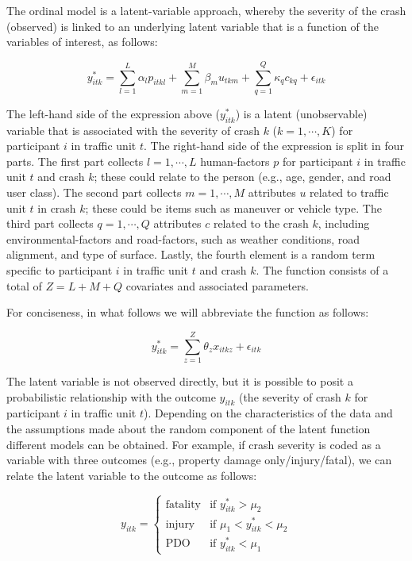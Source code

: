 \documentclass[]{elsarticle} %
\begin{document}
The ordinal model is a latent-variable approach, whereby the severity of
the crash (observed) is linked to an underlying latent variable that is
a function of the variables of interest, as follows:

\begin{equation}
\label{eq:latent-function}
y_{itk}^*=\sum_{l=1}^L\alpha_lp_{itkl} + \sum_{m=1}^M\beta_mu_{tkm} + \sum_{q=1}^Q\kappa_qc_{kq} + \epsilon_{itk}
\end{equation}

The left-hand side of the expression above (\(y_{itk}^*\)) is a latent
(unobservable) variable that is associated with the severity of crash
\(k\) (\(k=1,\cdots,K\)) for participant \(i\) in traffic unit \(t\).
The right-hand side of the expression is split in four parts. The first
part collects \(l=1,\cdots,L\) human-factors \(p\) for participant \(i\)
in traffic unit \(t\) and crash \(k\); these could relate to the person
(e.g., age, gender, and road user class). The second part collects
\(m=1,\cdots,M\) attributes \(u\) related to traffic unit \(t\) in crash
\(k\); these could be items such as maneuver or vehicle type. The third
part collects \(q=1,\cdots,Q\) attributes \(c\) related to the crash
\(k\), including environmental-factors and road-factors, such as weather
conditions, road alignment, and type of surface. Lastly, the fourth
element is a random term specific to participant \(i\) in traffic unit
\(t\) and crash \(k\). The function consists of a total of \(Z=L+M+Q\)
covariates and associated parameters.

For conciseness, in what follows we will abbreviate the function as
follows:

\begin{equation}
\label{eq:latent-function-compact}
y_{itk}^*=\sum_{z=1}^Z\theta_zx_{itkz} + \epsilon_{itk}
\end{equation}

The latent variable is not observed directly, but it is possible to
posit a probabilistic relationship with the outcome \(y_{itk}\) (the
severity of crash \(k\) for participant \(i\) in traffic unit \(t\)).
Depending on the characteristics of the data and the assumptions made
about the random component of the latent function different models can
be obtained. For example, if crash severity is coded as a variable with
three outcomes (e.g., property damage only/injury/fatal), we can relate
the latent variable to the outcome as follows:

\begin{equation}
\label{eq:latent-function-ordered-outcomes}
y_{itk} = 
\begin{cases}
\text{fatality} & \text{if } y_{itk}^*> \mu_2\\
\text{injury} & \text{if } \mu_1< y_{itk}^*< \mu_2\\
\text{PDO} & \text{if } y_{itk}^*< \mu_1
\end{cases}
\end{equation}
\end{document}
